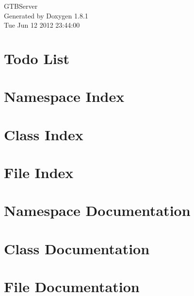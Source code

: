 \documentclass{book}
\begin{document}
\hypersetup{pageanchor=false,citecolor=blue}
\begin{titlepage}
\vspace*{7cm}
\begin{center}
{\Large G\-T\-B\-Server }\\
\vspace*{1cm}
{\large Generated by Doxygen 1.8.1}\\
\vspace*{0.5cm}
{\small Tue Jun 12 2012 23:44:00}\\
\end{center}
\end{titlepage}
\clearemptydoublepage
{}
\tableofcontents
\clearemptydoublepage
{}
\hypersetup{pageanchor=true,citecolor=blue}
\chapter{Todo List}
\label{todo}
\hypertarget{todo}{}

\chapter{Namespace Index}

\chapter{Class Index}

\chapter{File Index}

\chapter{Namespace Documentation}


\chapter{Class Documentation}











\chapter{File Documentation}












\printindex
\end{document}
